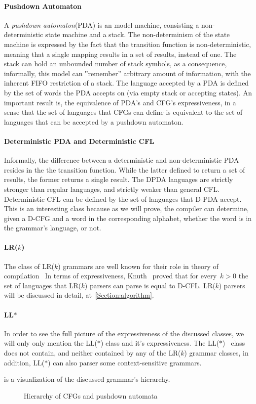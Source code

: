 \paragraph{Pushdown Automaton}
A \emph{pushdown automaton}(PDA) is an model machine, consisting a non-deterministic state machine
  and a stack.
The non-determinism of the state machine is expressed by the fact that the transition function
  is non-deterministic, meaning that a single mapping results in a set of results, instead of one.
The stack can hold an unbounded number of stack symbols, as a consequence, informally,
  this model can ‟remember” arbitrary amount of information, with the inherent FIFO restriction
  of a stack.
The language accepted by a PDA is defined by the set of words the PDA accepts on
  (via empty stack or accepting states).
An important result is, the equivalence of PDA's and CFG's expressiveness, in a sense that
  the set of languages that CFGs can define is equivalent to the set of languages that can be
  accepted by a pushdown automaton.
\paragraph{Deterministic PDA and Deterministic CFL}
Informally, the difference between a deterministic and non-deterministic PDA resides in the
  the transition function.
While the latter defined to return a set of results, the former returns a single result.
The DPDA languages are strictly stronger than regular languages, and strictly weaker than
  general CFL.
Deterministic CFL can be defined by the set of languages that D-PDA accept.
This is an interesting class because as we will prove, the \Java compiler can determine,
  given a D-CFG and a word in the corresponding alphabet, whether the word is in the
  grammar's language, or not.
\paragraph{LR($k$)}
The class of LR($k$) grammars are well known for their role in theory of compilation~\cite{Aho:86}
In terms of expressiveness, Knuth~\cite{Knuth:65} proved that for every~$k>0$ the set of languages
  that LR($k$) parsers can parse is equal to D-CFL.
LR($k$) parsers will be discussed in detail, at~\cref{Section:algorithm}.
\paragraph{LL{$*$}}
In order to see the full picture of the expressiveness of the discussed classes, we will only
  only mention the LL($*$) class and it's expressiveness. The LL($*$)~\cite{Parr:2011} class does not contain,
  and neither contained by any of the LR($k$) grammar classes, in addition, LL($*$) can also
  parser some context-sensitive grammars.

 is a visualization of the discussed grammar's hierarchy.

\begin{wrapfigure}{r}{0.6\linewidth}
  \caption{ \label{Figure:expressiveness}
  Hierarchy of CFGs and pushdown automata}
  
\end{wrapfigure}
